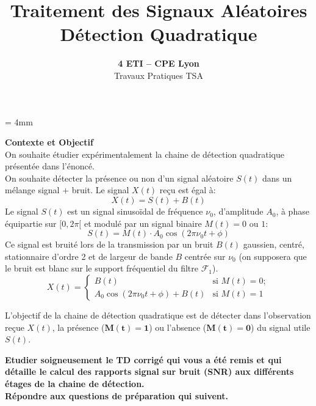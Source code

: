 \documentclass{article}
\begin{document}
\baselineskip = 4mm
\title{Traitement des Signaux Aléatoires \\
Détection Quadratique}
\author{\textbf{4 ETI -- CPE Lyon }\\[3mm]
{Travaux Pratiques TSA}}
\date{}

\maketitle

\noindent{}
\vspace*{5mm}


\textbf{\Large Contexte et Objectif}\\[4mm]

On souhaite étudier expérimentalement la chaine de détection quadratique présentée dans l'énoncé.\\
On souhaite détecter la présence ou non d'un signal aléatoire $S(t)$ dans un mélange signal $+$ bruit. Le signal $X(t)$ reçu est égal à:
$$
X(t) = S(t) + B(t) 
$$
Le signal $S(t)$ est un signal sinusoïdal de fréquence $\nu_0$, d'amplitude $A_0$, à phase équipartie sur $[0,2\pi[$ et modulé par un signal binaire $M(t) =  0$ ou $1$:
$$
S(t) = M(t) \cdot A_0 \cos (2\pi\nu_0 t + \phi) 
$$
Ce signal est bruité lors de la transmission par un bruit $B(t)$ gaussien, centré, stationnaire d'ordre 2 et de largeur de bande $B$ centrée sur $\nu_0$ (on supposera que le bruit est blanc sur le support fréquentiel du  filtre $\mathcal{F}_1$).
$$
X(t) = \left\{\begin{array}{ll}
B(t) & \mbox{si } M(t) = 0 ;\\[1mm]
A_0 \cos(2\pi\nu_0 t + \phi) + B(t) & \mbox{si } M(t) = 1
\end{array}
\right.
$$

L'objectif de la chaine de détection quadratique est de détecter dans l'observation reçue  $X(t)$, la présence ($\mathbf{M(t)=1}$) ou l'absence ($\mathbf{M(t) = 0}$) du signal utile $S(t)$.

\vspace*{5mm}

\textbf{ Etudier soigneusement le TD corrigé qui vous a été remis et qui détaille le calcul des rapports signal sur bruit (SNR)  aux différents étages de la chaine de détection. \\
Répondre aux questions de préparation qui suivent.
}
\end{document}
